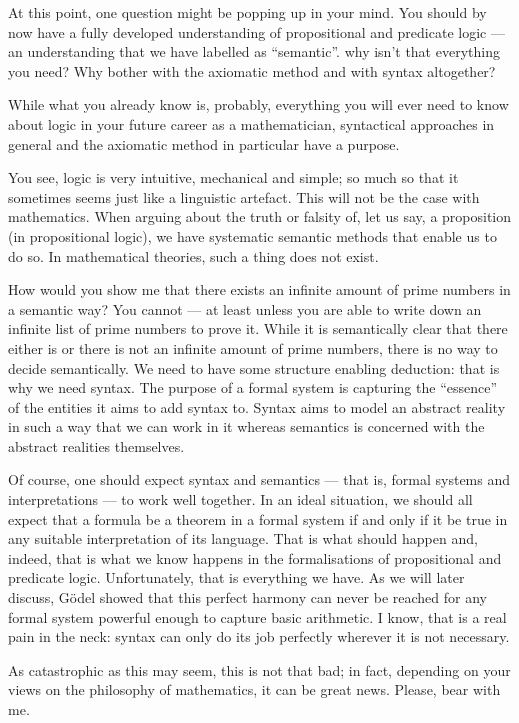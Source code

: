 \begin{para}
At this point, one question might be popping up in your mind. You should by now have a fully developed understanding of propositional and predicate logic --- an understanding that we have labelled as ``semantic''.
why isn't that everything you need? Why bother with the axiomatic method and with syntax altogether?

While what you already know is, probably, everything you will ever need to know about logic in your future career as a mathematician, syntactical approaches in general and the axiomatic method in particular have a purpose.

You see, logic is very intuitive, mechanical and simple; so much so that it sometimes seems just like a linguistic artefact.
This will not be the case with mathematics. When arguing about the truth or falsity of, let us say, a proposition (in propositional logic), we have systematic semantic methods that enable us to do so. In mathematical theories, such a thing does not exist.

How would you show me that there exists an infinite amount of prime numbers in a semantic way? You cannot --- at least unless you are able to write down an infinite list of prime numbers to prove it.
While it is semantically clear that there either is or there is not an infinite amount of prime numbers, there is no way to decide semantically.
We need to have some structure enabling deduction: that is why we need syntax.
The purpose of a formal system is capturing the ``essence'' of the entities it aims to add syntax to.
Syntax aims to model an abstract reality in such a way that we can work in it whereas semantics is concerned with the abstract realities themselves.

Of course, one should expect syntax and semantics --- that is, formal systems and interpretations --- to work well together. In an ideal situation, we should all expect that a formula be a theorem in a formal system if and only if it be true in any suitable interpretation of its language.
That is what should happen and, indeed, that is what we know happens in the formalisations of propositional and predicate logic. Unfortunately, that is everything we have.
As we will later discuss, G\"odel showed that this perfect harmony can never be reached for any formal system powerful enough to capture basic arithmetic. I know, that is a real pain in the neck: syntax can only do its job perfectly wherever it is not necessary.

As catastrophic as this may seem, this is not that bad; in fact, depending on your views on the philosophy of mathematics, it can be great news. Please, bear with me.
\label{whybother}
\end{para}


